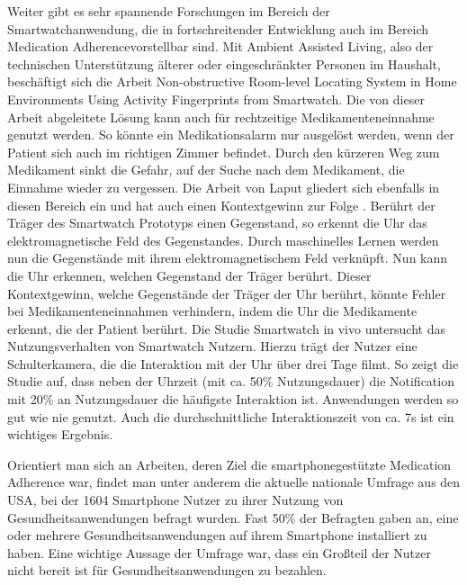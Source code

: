 Weiter gibt es sehr spannende Forschungen im Bereich der Smartwatchanwendung, die in fortschreitender Entwicklung auch im Bereich \glqq Medication Adherence\grqq vorstellbar sind. Mit Ambient Assisted Living, also der technischen Unterstützung älterer oder eingeschränkter Personen im Haushalt, beschäftigt sich die Arbeit \glqq Non-obstructive Room-level Locating System in Home Environments Using Activity Fingerprints from Smartwatch\grqq\cite{Lee:2015:NRL:2750858.2804272}. Die von dieser Arbeit abgeleitete Lösung kann auch für rechtzeitige Medikamenteneinnahme genutzt werden. So könnte ein Medikationsalarm nur ausgelöst werden, wenn der Patient sich auch im richtigen Zimmer befindet. Durch den kürzeren Weg zum Medikament sinkt die Gefahr, auf der Suche nach dem Medikament, die Einnahme wieder zu vergessen. Die Arbeit von Laput gliedert sich ebenfalls in diesen Bereich ein und hat auch einen Kontextgewinn zur Folge \cite{Laput:2015:ETR:2807442.2807481}. Berührt der Träger des  Smartwatch Prototyps einen Gegenstand, so erkennt die Uhr das elektromagnetische Feld des Gegenstandes. Durch maschinelles Lernen werden nun die Gegenstände mit ihrem elektromagnetischem Feld verknüpft. Nun kann die Uhr erkennen, welchen Gegenstand der Träger berührt. Dieser Kontextgewinn, welche Gegenstände der Träger der Uhr berührt, könnte Fehler bei Medikamenteneinnahmen verhindern, indem die Uhr die Medikamente erkennt, die der Patient berührt.
Die Studie \glqq Smartwatch in vivo\grqq \cite{Pizza:2016} untersucht das Nutzungsverhalten von Smartwatch Nutzern. Hierzu trägt der Nutzer eine Schulterkamera, die die Interaktion mit der Uhr über drei Tage filmt. So zeigt die Studie auf, dass neben der Uhrzeit (mit ca. 50\% Nutzungsdauer) die Notification mit 20\% an Nutzungsdauer die häufigste Interaktion ist. Anwendungen werden so gut wie nie genutzt. Auch die durchschnittliche Interaktionszeit von ca. 7s ist ein wichtiges Ergebnis.

Orientiert man sich an Arbeiten, deren Ziel die smartphonegestützte Medication Adherence war, findet man unter anderem die aktuelle nationale Umfrage \cite{Krebs-P:2015aa} aus den USA, bei der 1604 Smartphone Nutzer zu ihrer Nutzung von Gesundheitsanwendungen befragt wurden. Fast 50\% der Befragten gaben an, eine oder mehrere Gesundheitsanwendungen auf ihrem Smartphone installiert zu haben. Eine wichtige Aussage der Umfrage war, dass ein Großteil der Nutzer nicht bereit ist für Gesundheitsanwendungen zu bezahlen.

